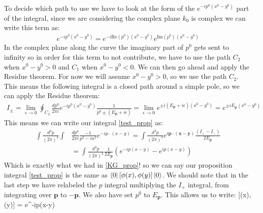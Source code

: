 \documentclass[11pt]{article}
\renewenvironment{flalign}{\vspace{-2mm}\empheq[box=\tcbhighmath]{align}}{\endempheq}
\numberwithin{equation}{section}
\begin{document}
\begin{itemize}
   To decide which path to use we have to look at the form of the $e^{-ip^0(x^0-y^0)}$ part of the integral, since we are considering the complex plane $k_0$ is complex we can write this term as: 
   \begin{align*}
   e^{-ip^0(x^0-y^0)} = e^{-i\text{Re}(p^0)(x^0-y^0)}e^{\text{Im}(p^0)(x^0-y^0)}
   \end{align*}
   In the complex plane along the curve the imaginary part of $p^0$ gets sent to infinity so in order for this term to not contribute, we have to use the path $C_2$ when $x^0-y^0>0$ and $C_1$ when $x^0-y^0<0$.  We can then go ahead and apply the Residue theorem. For now we will assume $x^{0}-y^0>0$, so we use the path $C_{2}$. This means the following integral is a closed path around a simple pole, so we can apply the Residue theorem: 
   \begin{align*}
    I_{\pm} = \lim_{\epsilon \rightarrow 0 } \oint_{C_2}\frac{dp^0}{2\pi i}e^{-ip^{0}(x^{0}-y^{0})}\frac{1}{p^0\pm (E_{\textbf{p}}+i\epsilon)} = \lim_{\epsilon \rightarrow 0 }e^{\pm i(E_{\textbf{p}}+i\epsilon)(x^{0}-y^0)}=e^{\pm iE_{\textbf{p}}(x^{0}-y^0)}
    \end{align*} 
    This means we can write our integral \ref{test_prop} as:
    \begin{align*}
    \int \frac{d^3p}{(2\pi)^3}\int&\frac{dp^{0}}{2\pi i}\frac{-1}{p^2-m^2}e^{-ip\cdot(x-y)} = \int \frac{d^3p}{(2\pi)^3}e^{i\textbf{p}\cdot(\textbf{x}-\textbf{y})}\frac{(I_{+}-I_{-})}{2E_{\textbf{p}}}  \\
    & = \int \frac{d^3p}{(2\pi)^3}\frac{1}{2E_{\textbf{p}}}\left(e^{-ip(x-y)}-e^{ip(x-y)}\right)
    \end{align*}
    Which is exactly what we had in \ref{KG_prop}! so we can say our proposition integral \ref{test_prop} is the same as $\bra{0}[\phi(x),\phi(y)]\ket{0}$. We should note that in the last step we have relabeled the $p$ integral multiplying the $I_{+}$ integral, from integrating over $\textbf{p}$ to $ -\textbf{p}$. We also have set $p^{0}$ to $E_{\textbf{p}}$. This allows us to write:
    \begin{flalign}
    \label{prop}
      [\phi(x),\phi(y)] = \int {}e^{-ip\cdot(x-y)}
    \end{flalign}
\end{itemize}
\end{document}
